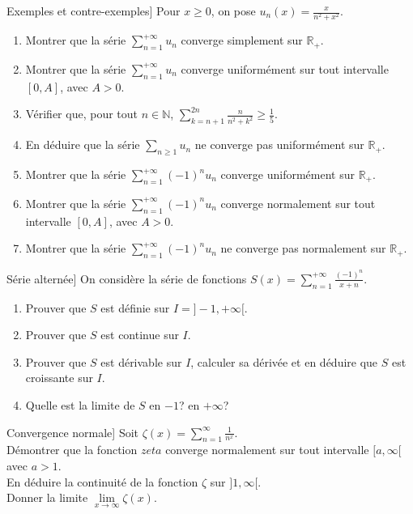 \documentclass{book}
\begin{document}
\begin{Exercice}Exemples et contre-exemples]
Pour $x\geq 0$, on pose $u_n(x)=\frac{x}{n^2+x^2}.$
\begin{enumerate}
\item Montrer que la série $\sum_{n=1}^{+\infty}u_n$ converge simplement sur $\mathbb R_+$.
\item  Montrer que la série $\sum_{n=1}^{+\infty}u_n$ converge uniformément sur tout intervalle $[0,A]$,
avec $A>0$.
\item Vérifier que, pour tout $n\in\mathbb N$, $\sum_{k=n+1}^{2n}\frac{n}{n^2+k^2}\geq\frac 15$.
\item En déduire que la série $\sum_{n\geq 1}u_n$ ne converge pas uniformément sur $\mathbb R_+$.
\item Montrer que la série $\sum_{n=1}^{+\infty}(-1)^n u_n$ converge uniformément sur $\mathbb R_+$.
\item Montrer que la série $\sum_{n=1}^{+\infty}(-1)^n u_n$ converge normalement sur tout intervalle $[0,A]$,
avec $A>0$.
\item Montrer que la série $\sum_{n=1}^{+\infty}(-1)^n u_n$ ne converge pas normalement sur $\mathbb R_+$.
\end{enumerate}
\end{Exercice}

\begin{Exercice}Série alternée]
On considère la série de fonctions $S(x)=\sum_{n=1}^{+\infty}\frac{(-1)^n}{x+n}$. 
\begin{enumerate}
\item Prouver que $S$ est définie sur $I=]-1,+\infty[$.
\item Prouver que $S$ est continue sur $I$.
\item Prouver que $S$ est dérivable sur $I$, calculer sa dérivée et en déduire que $S$ est croissante sur $I$.
\item Quelle est la limite de $S$ en $-1$? en $+\infty$?
\end{enumerate}
\end{Exercice}


\begin{Exercice}Convergence normale]
Soit $\zeta(x)=\sum_{n=1}^\infty \frac{1}{n^x}$.\\
Démontrer que la fonction $zeta$ converge normalement sur tout intervalle $[a,\infty[$ avec $a>1$.\\
En déduire la continuité de la fonction  $\zeta$ sur $]1,\infty[$.\\
Donner la limite $\lim\limits_{x\to \infty}\zeta(x)$.
 \end{Exercice}
 
\end{document}
